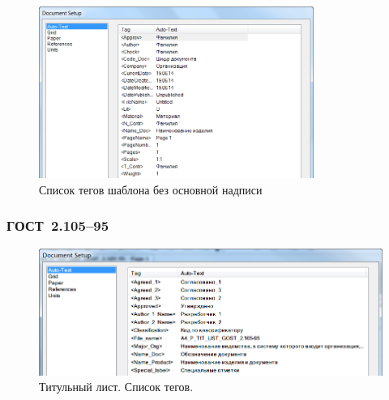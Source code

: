 \documentclass[14pt]{extreport}
\begin{document}
\begin{figure}[h]
	\centering
	\includegraphics[width=0.8\textwidth]{ESKD_EMPTY}
	\caption{Список тегов шаблона без основной надписи\label{ESKD_EMPTY}}
\end{figure}
\clearpage

\subsubsection{ГОСТ~2.105--95}

\begin{figure}[h]
	\centering
	\includegraphics[width=\textwidth]{ESKD_TIT_LIST}
    \caption{Титульный лист. Список тегов.\label{ESKD_TIT_LIST}}
\end{figure}
\end{document}

